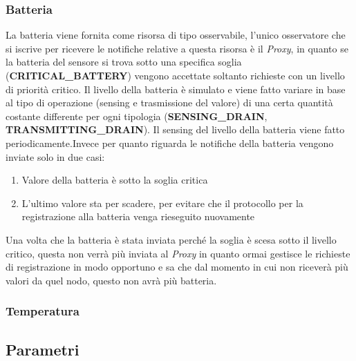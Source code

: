       \subsubsection{Batteria}
        La batteria viene fornita come risorsa di tipo osservabile, l'unico osservatore che si iscrive per ricevere le notifiche relative a questa risorsa è il \textit{Proxy},
        in quanto se la batteria del sensore si trova sotto una specifica soglia (\textbf{CRITICAL\_BATTERY}) vengono accettate
        soltanto richieste con un livello di priorità critico.\newline
        Il livello della batteria è simulato e viene fatto variare in base al tipo di operazione (sensing e trasmissione del valore)
        di una certa quantità costante differente per ogni tipologia (\textbf{SENSING\_DRAIN}, \textbf{TRANSMITTING\_DRAIN}).\newline
        Il sensing del livello della batteria viene fatto periodicamente.Invece per quanto riguarda le notifiche della batteria vengono inviate solo in due casi:
        \begin{enumerate}
          \item Valore della batteria è sotto la soglia critica
          \item L'ultimo valore sta per scadere, per evitare che il protocollo per la registrazione alla batteria venga rieseguito nuovamente
        \end{enumerate}

        Una volta che la batteria è stata inviata perché la soglia è scesa sotto il livello critico, questa non verrà più inviata al \textit{Proxy} in quanto ormai gestisce le richieste di registrazione in modo
        opportuno e sa che dal momento in cui non riceverà più valori da quel nodo, questo non avrà più batteria.

        


      \subsubsection{Temperatura}

    \subsection{Parametri}
